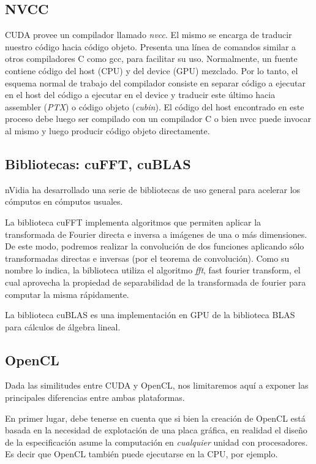 \subsection{NVCC}
CUDA provee un compilador llamado {\em nvcc}.
El mismo se encarga de traducir nuestro c\'odigo hacia c\'odigo objeto.
Presenta una l\'inea de comandos similar a otros compiladores C como gcc, para facilitar su uso.
Normalmente, un fuente contiene c\'odigo del host (CPU) y del device (GPU) mezclado.
Por lo tanto, el esquema normal de trabajo del compilador consiste en separar c\'odigo a ejecutar en el host del c\'odigo a ejecutar en el device y traducir este \'ultimo hacia assembler ({\em PTX}) o c\'odigo objeto ({\em cubin}).
El c\'odigo del host encontrado en este proceso debe luego ser compilado con un compilador C o bien nvcc puede invocar al mismo y luego producir c\'odigo objeto directamente.

\subsection{Bibliotecas: cuFFT, cuBLAS}
nVidia ha desarrollado una serie de bibliotecas de uso general para acelerar los cómputos en cómputos usuales.

La biblioteca cuFFT implementa algoritmos que permiten aplicar la transformada de Fourier directa e inversa a im\'agenes de una o m\'as dimensiones.
De este modo, podremos realizar la convoluci\'on de dos funciones aplicando s\'olo transformadas directas e inversas (por el teorema de convoluci\'on).
Como su nombre lo indica, la biblioteca utiliza el algoritmo {\em fft}, fast fourier transform, el cual aprovecha la propiedad de separabilidad de la transformada de fourier para computar la misma rápidamente.

La biblioteca cuBLAS es una implementación en GPU de la biblioteca BLAS para cálculos de álgebra lineal.


\subsection{OpenCL}
Dada las similitudes entre CUDA y OpenCL, nos limitaremos aquí a exponer las principales diferencias entre ambas plataformas.

En primer lugar, debe tenerse en cuenta que si bien la creación de OpenCL está basada en la necesidad de explotación de una placa gráfica, en realidad el diseño de la especificación asume la computación en {\em cualquier} unidad con procesadores.
Es decir que OpenCL también puede ejecutarse en la CPU, por ejemplo.


